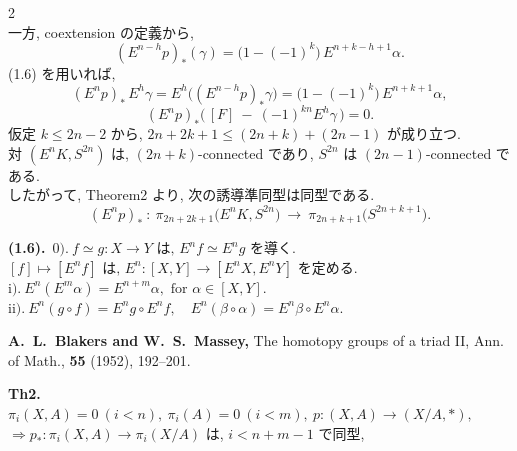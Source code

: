 \documentclass[10pt, leqno]{ltjsarticle}
\newcommand{\Ex}{E}        %
\newcommand{\pis}[2]{\pi_{#1}(#2)}       %
\numberwithin{equation}{section}
\theoremstyle{plain}
\theoremstyle{definition}
\theoremstyle{remark}
\begin{document}
\begin{paracol}{2}
\[\]
一方, coextension の定義から,
\[
(\Ex^{n-h}p)_*(\gamma) = \bigl(1-(-1)^k\bigr)\,\Ex^{n+k-h+1}\alpha .
\]
(1.6) を用いれば,
\[
(\Ex^{n}p)_*\,\Ex^{h}\gamma
=\Ex^{h}\!\bigl((\Ex^{n-h}p)_*\gamma\bigr)
=\bigl(1-(-1)^k\bigr)\,\Ex^{n+k+1}\alpha,
\]
\[
(\Ex^{n}p)_*\bigl(\,[F]\ -\ (-1)^{kn}\Ex^{h}\gamma\,\bigr) = 0 .
\]
仮定 $k\le 2n-2$ から, 
$2n+2k+1\le (2n+k)+(2n-1)$ が成り立つ. \\
対 $(\Ex^{n}K, S^{2n})$ は, $(2n+k)$-connected であり, 
$S^{2n}$ は $(2n-1)$-connected である. \\
したがって, \cite{BlakersMassey1952} Theorem2 より, 次の誘導準同型は同型である.
\[
(\Ex^{n}p)_*\ :\ 
\pi_{2n+2k+1}\bigl(\Ex^{n}K,S^{2n}\bigr)\
\longrightarrow\
\pi_{2n+k+1}\bigl(S^{2n+k+1}\bigr).
\]

\switchcolumn

\noindent
\textbf{(1.6).}\
\(\text{0).}\ 
f\simeq g:X\to Y \text{ は, }
E^n f\simeq E^n g \text{ を導く.}\)\\
\([f]\mapsto [E^n f] \text{ は, } 
E^n : [X,Y] \to [E^n X, E^n Y] \text{ を定める.}\)\\
\(\text{i).}\ 
E^n(E^m\alpha) = E^{n+m}\alpha,
\text{ for } \alpha\in [X,Y].\)\\
\(\text{ii).}\
E^n(g\circ f) = E^n g\circ E^n f,\quad
E^n(\beta\circ\alpha) = E^n\beta\circ E^n\alpha.\)

\noindent
\textbf{
\cite{BlakersMassey1952}
A.~L.~Blakers and W.~S.~Massey,}
\newblock The homotopy groups of a triad II,
\newblock Ann. of Math., {\bf 55} (1952), 192--201.

\noindent
\textbf{Th2.}\ \(\pi_i(X,A)=0\ (i<n),\ \pi_i(A)=0\ (i<m),\ 
p:(X,A)\to(X/A,*),\)\\
\(\Longrightarrow p_*:\pis{i}{X,A}\to\pis{i}{X/A}\)
は, \(i<n+m-1\) で同型, \\


\end{paracol}
\end{document}
